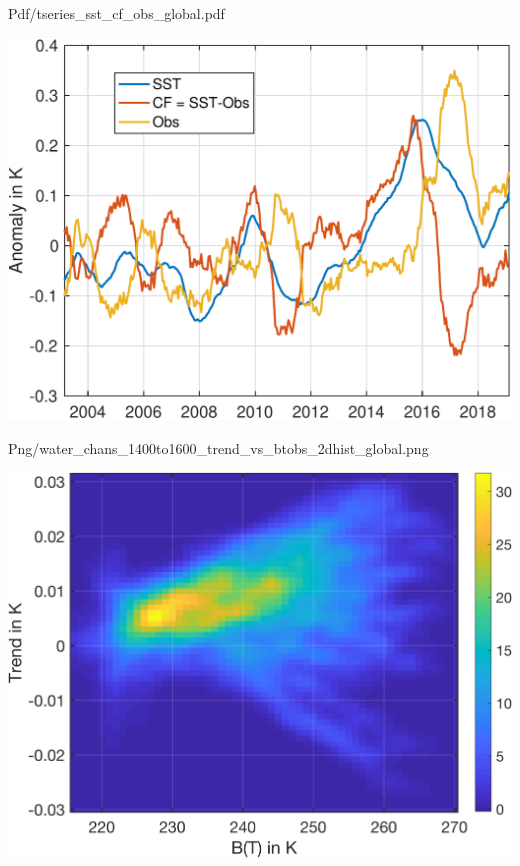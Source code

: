 \documentclass[presentation]{beamer}
\begin{document}
\begin{frame}[label={sec:org599094e}]{Pdf/tseries\_sst\_cf\_obs\_global.pdf}
\begin{center}
\includegraphics[width=0.7\linewidth]{./Figs/Pdf/tseries_sst_cf_obs_global.pdf}
\end{center}
\end{frame}

\begin{frame}[label={sec:org2e2c62a}]{Png/water\_chans\_1400to1600\_trend\_vs\_btobs\_2dhist\_global.png}
\begin{center}
\includegraphics[width=0.7\linewidth]{./Figs/Png/water_chans_1400to1600_trend_vs_btobs_2dhist_global.png}
\end{center}
\end{frame}
\end{document}
